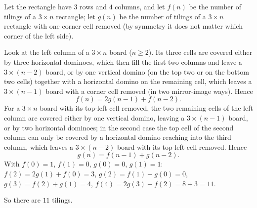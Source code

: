 Let the rectangle have $3$ rows and $4$ columns, and let $f(n)$ be the number of tilings of a $3\times n$ rectangle; let $g(n)$ be the number of tilings of a $3\times n$ rectangle with one corner cell removed (by symmetry it does not matter which corner of the left side).

Look at the left column of a $3\times n$ board ($n\ge2$). Its three cells are covered either by three horizontal dominoes, which then fill the first two columns and leave a $3\times(n-2)$ board, or by one vertical domino (on the top two or on the bottom two cells) together with a horizontal domino on the remaining cell, which leaves a $3\times(n-1)$ board with a corner cell removed (in two mirror-image ways). Hence
\[
f(n)=2g(n-1)+f(n-2).
\]
For a $3\times n$ board with its top-left cell removed, the two remaining cells of the left column are covered either by one vertical domino, leaving a $3\times(n-1)$ board, or by two horizontal dominoes; in the second case the top cell of the second column can only be covered by a horizontal domino reaching into the third column, which leaves a $3\times(n-2)$ board with its top-left cell removed. Hence
\[
g(n)=f(n-1)+g(n-2).
\]
With $f(0)=1$, $f(1)=0$, $g(0)=0$, $g(1)=1$: $f(2)=2g(1)+f(0)=3$, $g(2)=f(1)+g(0)=0$, $g(3)=f(2)+g(1)=4$, $f(4)=2g(3)+f(2)=8+3=11$.

So there are $\boxed{11}$ tilings.
